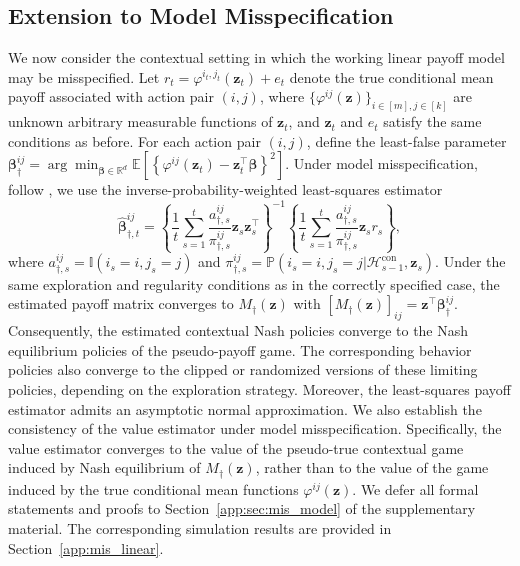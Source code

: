 \documentclass[12pt]{article}
\begin{document}
\subsection{Extension to Model Misspecification}
\label{app:mis_model}
We now consider the contextual setting in which the working linear payoff model may be misspecified. Let $r_t=\varphi^{i_t,j_t}(\bm z_t)+e_t$ denote the true conditional mean payoff associated with action pair $(i,j)$, where $\{\varphi^{ij}(\bm z)\}_{i\in [m],j\in[k]}$ are unknown arbitrary measurable functions of $\bm z_t$, and $\bm z_t$ and $e_t$ satisfy the same conditions as before. For each action pair $(i,j)$, define the least-false parameter $\bm \beta_\dagger^{ij}=\arg\min_{\bm\beta\in\mathbb R^d}\mathbb E\left[\left\{\varphi^{ij}(\bm z_t)-\bm z_t^\top\bm\beta\right\}^2\right]$. Under model misspecification, follow \cite{chen2021statistical}, we use the inverse-probability-weighted least-squares estimator
\begin{equation*}
\widehat{\bm\beta}_{\dagger,t}^{ij}
=
\left\{
\frac{1}{t}
\sum_{s=1}^t
\frac{a_{\dagger,s}^{ij}}{
\pi_{\dagger,s}^{ij}}
\bm z_s\bm z_s^\top
\right\}^{-1}
\left\{
\frac{1}{t}
\sum_{s=1}^t
\frac{a_{\dagger,s}^{ij}}{\pi_{\dagger,s}^{ij}}
\bm z_sr_s
\right\},
\end{equation*}
where $a_{\dagger,s}^{ij}=\mathbb{I}(i_s=i,j_s=j)$ and $\pi_{\dagger,s}^{ij}=\mathbb{P}(i_s=i,j_s=j\vert \mathcal{H}_{s-1}^{\mathrm{con}}, \bm{z}_s)$.
Under the same exploration and regularity conditions as in the correctly specified case, the estimated payoff matrix converges to $M_\dagger(\bm z)$ with $[M_\dagger(\bm z)]_{ij}=\bm z^\top \bm \beta_\dagger^{ij}$. Consequently, the estimated contextual Nash policies converge to the Nash equilibrium policies of the pseudo-payoff game. The corresponding behavior policies also converge to the clipped or randomized versions of these limiting policies, depending on the exploration strategy. Moreover, the least-squares payoff estimator admits an asymptotic normal approximation. We also establish the consistency of the value estimator under model misspecification. 
Specifically, the value estimator converges to the value of the pseudo-true contextual game induced by Nash equilibrium of $M_\dagger(\bm z)$, rather than to the value of the game induced by the true conditional mean functions ${\varphi^{ij}(\bm z)}$.
We defer all formal statements and proofs to Section~\ref{app:sec:mis_model} of the supplementary material. The corresponding simulation results are provided in Section~\ref{app:mis_linear}.
\end{document}
